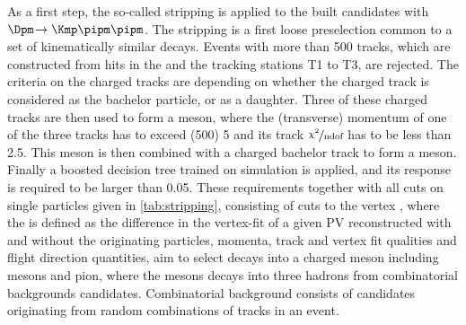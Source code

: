 As a first step, the so-called stripping is applied to the built \BdToDpi candidates with \mbox{$\Dpm\!\to\Kmp\pipm\pipm$}.
The stripping is a first loose preselection common to a set of kinematically similar decays.
Events with more than \num{500} tracks, which are constructed from hits in the \velo and the tracking stations T1 to T3, are rejected.
The criteria on the charged tracks are depending on whether the charged track is considered as the bachelor particle, or as a \Dm daughter.
Three of these charged tracks are then used to form a \Dm meson, where the (transverse) momentum of one of the three tracks has to exceed (\SI[per-mode=symbol]{500}{\MeVc}) \SI[per-mode=symbol]{5}{\GeVc} and its track $\nicefrac{\chi^2}{\text{ndof}}$ has to be less than \num{2.5}.
This \Dm meson is then combined with a charged bachelor track to form a \Bz meson.
Finally a boosted decision tree trained on simulation is applied, and its response is required to be larger than \num{0.05}.
These requirements together with all cuts on single particles given in \cref{tab:stripping}, consisting of cuts to the vertex \chisqip, where the \chisqip is defined as the difference in the vertex-fit of a given \ac{PV} reconstructed with and without the originating particles, momenta, track and vertex fit qualities and flight direction quantities, aim to select \Bz decays into a charged \Dmp meson including \Dstarmp mesons and pion, where the \Dmp mesons decays into three hadrons from combinatorial backgrounds candidates.
Combinatorial background consists of candidates originating from random combinations of tracks in an event.

